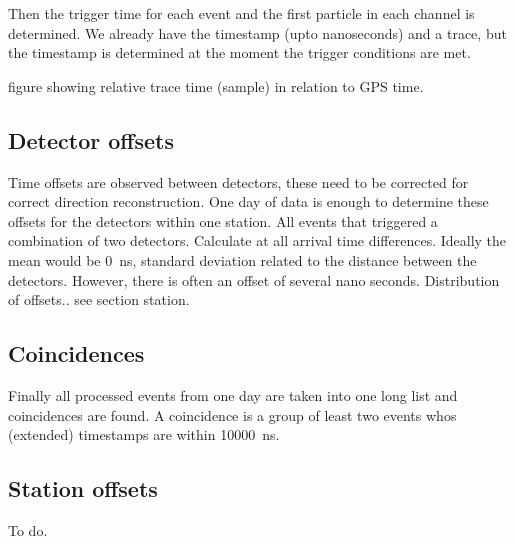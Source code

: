 Then the trigger time for each event and the first particle in each channel is determined. We already have the \gps timestamp (upto nanoseconds) and a trace, but the timestamp is determined at the moment the trigger conditions are met.

figure showing  relative trace time (sample)  in relation to GPS time.


\subsection{Detector offsets}

Time offsets are observed between detectors, these need to be corrected for correct direction reconstruction. One day of data is enough to determine these offsets for the detectors within one station. All events that triggered a combination of two detectors. Calculate at all arrival time differences. Ideally the mean would be \SI{0}{\ns}, standard deviation related to the distance between the detectors. However, there is often an offset of several nano seconds. Distribution of offsets.. see section station.


\subsection{Coincidences}

Finally all processed events from one day are taken into one long list and coincidences are found. A coincidence is a group of least two events whos (extended) timestamps are within \SI{10000}{\ns}.


\subsection{Station offsets}

To do.
